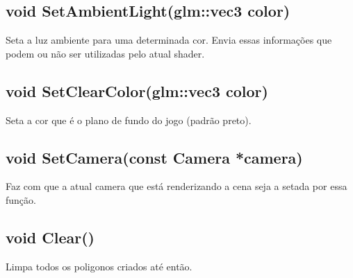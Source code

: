 \subsection{void SetAmbientLight(glm::vec3 color)}
Seta a luz ambiente para uma determinada cor. Envia essas informações que podem ou não ser utilizadas pelo atual shader.

\subsection{void SetClearColor(glm::vec3 color)}
Seta a cor que é o plano de fundo do jogo (padrão preto).

\subsection{void SetCamera(const Camera *camera)}
Faz com que a atual camera que está renderizando a cena seja a setada por essa função.

\subsection{void Clear()}
Limpa todos os poligonos criados até então.

